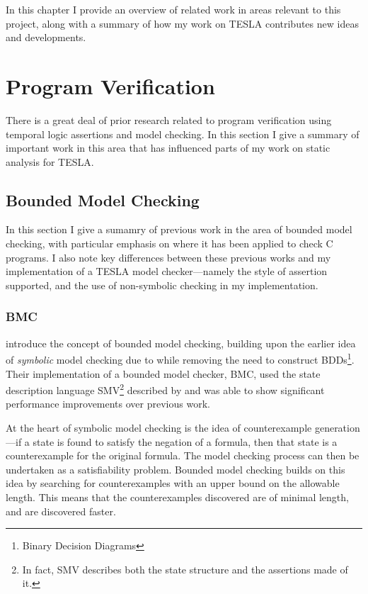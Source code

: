 In this chapter I provide an overview of related work in areas relevant
to this project, along with a summary of how my work on TESLA
contributes new ideas and developments.

\section{Program Verification} \label{sec:bounded-model-checking}

There is a great deal of prior research related to program verification using
temporal logic assertions and model checking. In this section I give a summary
of important work in this area that has influenced parts of my work on static
analysis for TESLA.

\subsection{Bounded Model Checking}

In this section I give a sumamry of previous work in the area of bounded
model checking, with particular emphasis on where it has been applied to
check C programs. I also note key differences between these previous
works and my implementation of a TESLA model checker---namely the style
of assertion supported, and the use of non-symbolic checking in my
implementation.

\subsubsection{BMC}

\textcite{biere_symbolic_1999} introduce the concept of bounded model
checking, building upon the earlier idea of \emph{symbolic} model
checking due to \textcite{mcmillan_symbolic_1992} while removing the
need to construct BDDs\footnote{Binary Decision Diagrams}. Their
implementation of a bounded model checker, BMC, used the state
description language SMV\footnote{In fact, SMV describes both the state
structure and the assertions made of it.} described by
\citeauthor{mcmillan_symbolic_1992} and was able to show significant
performance improvements over previous work.

At the heart of symbolic model checking is the idea of counterexample
generation---if a state is found to satisfy the negation of a formula,
then that state is a counterexample for the original formula. The model
checking process can then be undertaken as a satisfiability problem.
Bounded model checking builds on this idea by searching for
counterexamples with an upper bound on the allowable length. This means
that the counterexamples discovered are of minimal length, and are
discovered faster.

